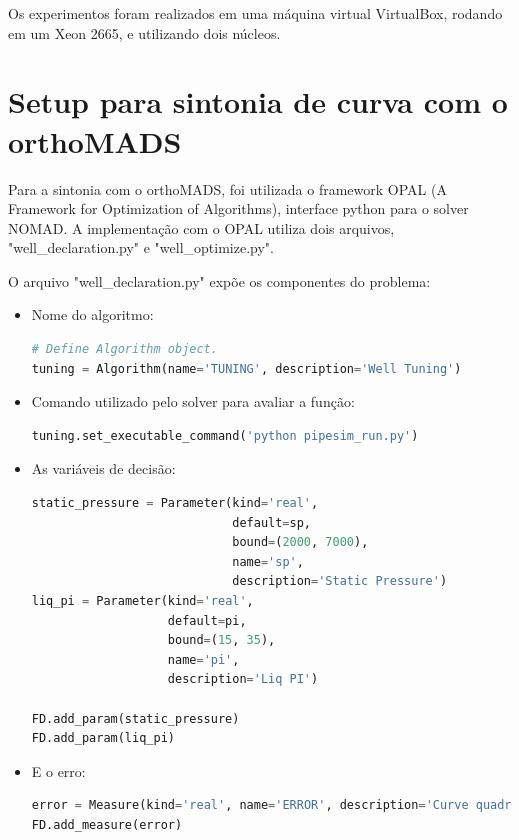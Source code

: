 Os experimentos foram realizados em uma máquina virtual VirtualBox, rodando em um Xeon 2665, e utilizando dois núcleos.

\section{Setup para sintonia de curva com o orthoMADS}
Para a sintonia com o orthoMADS, foi utilizada o framework OPAL (A Framework for Optimization of Algorithms), interface python para o solver NOMAD.
A implementação com o OPAL utiliza dois arquivos, "well\_declaration.py" e "well\_optimize.py".

O arquivo "well\_declaration.py" expõe os componentes do problema:

\begin{itemize}
\item Nome do algoritmo:
\begin{lstlisting}[language=Python]
# Define Algorithm object.
tuning = Algorithm(name='TUNING', description='Well Tuning')
\end{lstlisting}
\end{itemize}

\begin{itemize}
\item Comando utilizado pelo solver para avaliar a função:
\begin{lstlisting}[language=Python]
tuning.set_executable_command('python pipesim_run.py')
\end{lstlisting}
\end{itemize}


\begin{itemize}
\item As variáveis de decisão:
\begin{lstlisting}[language=Python]
static_pressure = Parameter(kind='real', 
                            default=sp, 
                            bound=(2000, 7000),
                            name='sp', 
                            description='Static Pressure')
liq_pi = Parameter(kind='real', 
                   default=pi, 
                   bound=(15, 35),
                   name='pi', 
                   description='Liq PI')

FD.add_param(static_pressure)
FD.add_param(liq_pi)
\end{lstlisting}
\end{itemize}

\begin{itemize}
\item E o erro:
\begin{lstlisting}[language=Python]
error = Measure(kind='real', name='ERROR', description='Curve quadratic error')
FD.add_measure(error)
\end{lstlisting}
\end{itemize}

